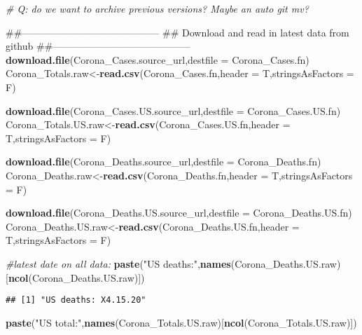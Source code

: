 \documentclass[]{article}
\newenvironment{Shaded}{\begin{snugshade}}{\end{snugshade}}
\newcommand{\KeywordTok}[1]{\textcolor[rgb]{0.13,0.29,0.53}{\textbf{{#1}}}}
\newcommand{\DataTypeTok}[1]{\textcolor[rgb]{0.13,0.29,0.53}{{#1}}}
\newcommand{\StringTok}[1]{\textcolor[rgb]{0.31,0.60,0.02}{{#1}}}
\newcommand{\CommentTok}[1]{\textcolor[rgb]{0.56,0.35,0.01}{\textit{{#1}}}}
\newcommand{\NormalTok}[1]{{#1}}
\begin{document}
\begin{Shaded}
\begin{Highlighting}[]
\CommentTok{# Q: do we want to archive previous versions? Maybe an auto git mv? }

\NormalTok{##------------------------------------------}
\NormalTok{## Download and read in latest data from github}
\NormalTok{##------------------------------------------}
\KeywordTok{download.file}\NormalTok{(Corona_Cases.source_url,}\DataTypeTok{destfile =} \NormalTok{Corona_Cases.fn)}
\NormalTok{Corona_Totals.raw<-}\KeywordTok{read.csv}\NormalTok{(Corona_Cases.fn,}\DataTypeTok{header =} \NormalTok{T,}\DataTypeTok{stringsAsFactors =} \NormalTok{F)}

\KeywordTok{download.file}\NormalTok{(Corona_Cases.US.source_url,}\DataTypeTok{destfile =} \NormalTok{Corona_Cases.US.fn)}
\NormalTok{Corona_Totals.US.raw<-}\KeywordTok{read.csv}\NormalTok{(Corona_Cases.US.fn,}\DataTypeTok{header =} \NormalTok{T,}\DataTypeTok{stringsAsFactors =} \NormalTok{F)}

\KeywordTok{download.file}\NormalTok{(Corona_Deaths.source_url,}\DataTypeTok{destfile =} \NormalTok{Corona_Deaths.fn)}
\NormalTok{Corona_Deaths.raw<-}\KeywordTok{read.csv}\NormalTok{(Corona_Deaths.fn,}\DataTypeTok{header =} \NormalTok{T,}\DataTypeTok{stringsAsFactors =} \NormalTok{F)}

\KeywordTok{download.file}\NormalTok{(Corona_Deaths.US.source_url,}\DataTypeTok{destfile =} \NormalTok{Corona_Deaths.US.fn)}
\NormalTok{Corona_Deaths.US.raw<-}\KeywordTok{read.csv}\NormalTok{(Corona_Deaths.US.fn,}\DataTypeTok{header =} \NormalTok{T,}\DataTypeTok{stringsAsFactors =} \NormalTok{F)}

\CommentTok{#latest date on all data:}
\KeywordTok{paste}\NormalTok{(}\StringTok{"US deaths:"}\NormalTok{,}\KeywordTok{names}\NormalTok{(Corona_Deaths.US.raw)[}\KeywordTok{ncol}\NormalTok{(Corona_Deaths.US.raw)])}
\end{Highlighting}
\end{Shaded}

\begin{verbatim}
## [1] "US deaths: X4.15.20"
\end{verbatim}

\begin{Shaded}
\begin{Highlighting}[]
\KeywordTok{paste}\NormalTok{(}\StringTok{"US total:"}\NormalTok{,}\KeywordTok{names}\NormalTok{(Corona_Totals.US.raw)[}\KeywordTok{ncol}\NormalTok{(Corona_Totals.US.raw)])}
\end{Highlighting}
\end{Shaded}
\end{document}
